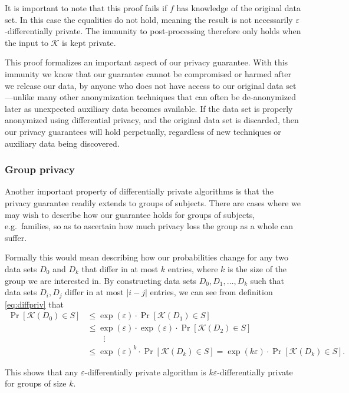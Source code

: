 \documentclass[a4paper,12pt]{article}
\newcommand{\fancy}{\mathcal}
\renewcommand{\epsilon}{\varepsilon}
\begin{document}
It is important to note that this proof fails if $f$ has knowledge of the original data set. In this case the equalities do not hold, meaning the result is not necessarily $\epsilon$-differentially private. The immunity to post-processing therefore only holds when the input to $\fancy{K}$ is kept private.

This proof formalizes an important aspect of our privacy guarantee. With this immunity we know that our guarantee cannot be compromised or harmed after we release our data, by anyone who does not have access to our original data set---unlike many other anonymization techniques that can often be de-anonymized later as unexpected auxiliary data becomes available. If the data set is properly anonymized using differential privacy, and the original data set is discarded, then our privacy guarantees will hold perpetually, regardless of new techniques or auxiliary data being discovered.

\subsubsection{Group privacy}

Another important property of differentially private algorithms is that the privacy guarantee readily extends to groups of subjects. There are cases where we may wish to describe how our guarantee holds for groups of subjects, e.g.\ families, so as to ascertain how much privacy loss the group as a whole can suffer.

Formally this would mean describing how our probabilities change for any two data sets $D_0$ and $D_k$ that differ in at most $k$ entries, where $k$ is the size of the group we are interested in. By constructing data sets $D_0, D_1, \dots, D_k$ such that data sets $D_i,D_j$ differ in at most $|i-j|$ entries, we can see from definition \ref{eq:diffpriv} that
\begin{align*}
    \Pr[\fancy{K}(D_0) \in S] &\leq \exp(\epsilon) \cdot \Pr[\fancy{K}(D_1) \in S] \\
        &\leq \exp(\epsilon) \cdot \exp(\epsilon) \cdot \Pr[\fancy{K}(D_2) \in S] \\
        &\qquad\vdots \\
        &\leq \exp(\epsilon)^k \cdot \Pr[\fancy{K}(D_k) \in S] = \exp(k\epsilon) \cdot \Pr[\fancy{K}(D_k) \in S].
\end{align*}

This shows that any $\epsilon$-differentially private algorithm is $k\epsilon$-differentially private for groups of size $k$. 
\end{document}
